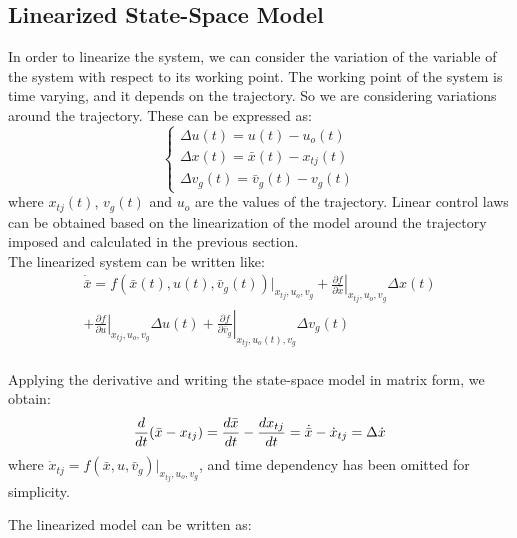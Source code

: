 \documentclass[DIV=calc, paper=a4, fontsize=11pt, twocolumn]{scrartcl}	 %
\begin{document}
\subsection{Linearized State-Space Model}
In order to linearize the system, we can consider the variation of the variable of the system with respect to its working point. The working point of the system is time varying, and it depends on the trajectory. So we are considering variations around the trajectory. These can be expressed as:
\begin{equation}
\begin{cases}
\Delta{u}(t) = u(t) - u_o(t)\\
\Delta{x}(t) = \bar{x}(t) - x_{tj}(t) \\
\Delta{v}_g(t) = \bar{v}_g(t) - v_g(t)
\end{cases}
\end{equation}
where $x_{tj}(t)$, $v_g(t)$ and $u_o$ are the values of the trajectory.
Linear control laws can be obtained based on the linearization of the model around the trajectory imposed and calculated in the previous section.\\ 
The linearized system can be written like:
\begin{equation}
\begin{split}
\dot{\bar{x}} = f(\bar{x}(t), u(t), \bar{v}_g(t))|_{x_{tj},u_o, v_g} +  \left. \frac{\partial f}{\partial \bar{x}} \right|_{x_{tj},u_o, v_g} \Delta{x}(t) \\ + \left. \frac{\partial f}{\partial u} \right|_{x_{tj}, u_o, v_g} \Delta{u}(t) + \left. \frac{\partial f}{\partial \bar{v}_g} \right|_{x_{tj}, u_o(t), v_g} \Delta{v_g(t)}
\end{split}
\end{equation}
\\Applying the derivative and writing the state-space model in matrix form, we obtain:
{\small
\begin{equation}
\frac{d}{dt}(\bar{x} - x_{tj}) = \frac{d\bar{x}}{dt} - {\frac{dx_{tj}}{dt}} = \dot{\bar{x}} - \dot{x}_{tj} = \\\Delta{\dot{x}}
\end{equation}
}
where $\dot{x}_{tj} = f(\bar{x}, u, \bar{v}_g)|_{x_{tj},u_o, v_g}$, and time dependency has been omitted for simplicity.

The linearized model can be written as:

\end{document}
